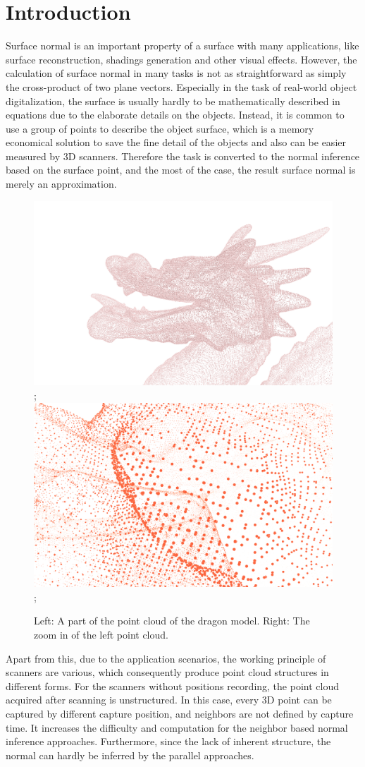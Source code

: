 
\chapter{Introduction} %

\label{ch:introduction} %

Surface normal is an important property of a surface with many applications, like surface reconstruction, shadings generation and other visual effects. However, the calculation of surface normal in many tasks is not as straightforward as simply the cross-product of two plane vectors. Especially in the task of real-world object digitalization, the surface is usually hardly to be mathematically described in equations due to the elaborate details on the objects. Instead, it is common to use a group of points to describe the object surface, which is a memory economical solution to save the fine detail of the objects and also can be easier measured by 3D scanners. Therefore the task is converted to the normal inference based on the surface point, and the most of the case, the result surface normal is merely an approximation. 

\begin{figure}[h!]
	\centering
	{\includegraphics[width=.45\textwidth]{./Figures/point-cloud.png}};
	{\includegraphics[width=.45\textwidth]{./Figures/point-cloud-zoom-in.png}};
	\decoRule
	\caption{Left: A part of the point cloud of the dragon model. Right: The zoom in of the left point cloud.}
	\label{fig:point-cloud}
\end{figure}

Apart from this, due to the application scenarios, the working principle of scanners are various, which consequently produce point cloud structures in different forms. For the scanners without positions recording, the point cloud acquired after scanning is unstructured. In this case, every 3D point can be captured by different capture position, and neighbors are not defined by capture time. It increases the difficulty and computation for the neighbor based normal inference approaches.  Furthermore, since the lack of inherent structure, the normal can hardly be inferred by the parallel approaches. 

